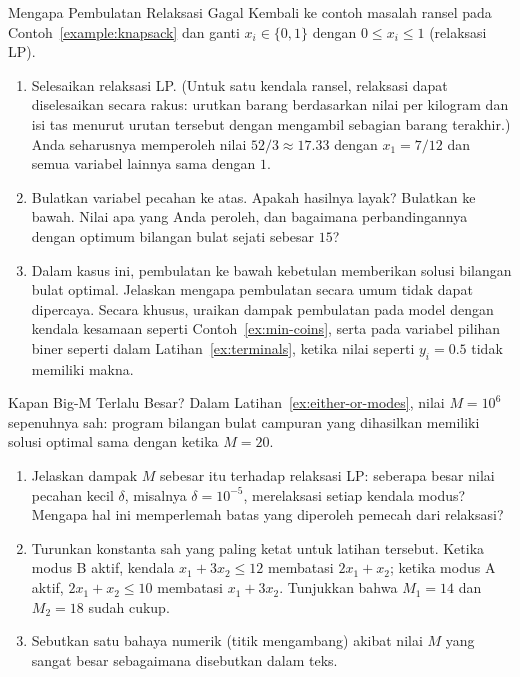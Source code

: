 \begin{ex}{Mengapa Pembulatan Relaksasi Gagal}{}
\label{ex:lp-rounding}
 Kembali ke contoh masalah ransel pada Contoh~\ref{example:knapsack} dan ganti $x_i \in \{0,1\}$ dengan $0 \leq x_i \leq 1$ (relaksasi LP).
\begin{enumerate}
\item Selesaikan relaksasi LP. (Untuk satu kendala ransel, relaksasi dapat diselesaikan secara rakus: urutkan barang berdasarkan nilai per kilogram dan isi tas menurut urutan tersebut dengan mengambil sebagian barang terakhir.) Anda seharusnya memperoleh nilai $52/3 \approx 17.33$ dengan $x_1 = 7/12$ dan semua variabel lainnya sama dengan $1$.
\item Bulatkan variabel pecahan ke atas. Apakah hasilnya layak? Bulatkan ke bawah. Nilai apa yang Anda peroleh, dan bagaimana perbandingannya dengan optimum bilangan bulat sejati sebesar $15$?
\item Dalam kasus ini, pembulatan ke bawah kebetulan memberikan solusi bilangan bulat optimal. Jelaskan mengapa pembulatan secara umum tidak dapat dipercaya. Secara khusus, uraikan dampak pembulatan pada model dengan kendala kesamaan seperti Contoh~\ref{ex:min-coins}, serta pada variabel pilihan biner seperti dalam Latihan~\ref{ex:terminals}, ketika nilai seperti $y_i = 0.5$ tidak memiliki makna.
\end{enumerate}
\end{ex}

\begin{ex}{Kapan Big-M Terlalu Besar?}{}
\label{ex:bigM-size}
 Dalam Latihan~\ref{ex:either-or-modes}, nilai $M = 10^6$ sepenuhnya sah: program bilangan bulat campuran yang dihasilkan memiliki solusi optimal sama dengan ketika $M = 20$.
\begin{enumerate}
\item Jelaskan dampak $M$ sebesar itu terhadap relaksasi LP: seberapa besar nilai pecahan kecil $\delta$, misalnya $\delta = 10^{-5}$, merelaksasi setiap kendala modus? Mengapa hal ini memperlemah batas yang diperoleh pemecah dari relaksasi?
\item Turunkan konstanta sah yang paling ketat untuk latihan tersebut. Ketika modus B aktif, kendala $x_1 + 3x_2 \leq 12$ membatasi $2x_1 + x_2$; ketika modus A aktif, $2x_1 + x_2 \leq 10$ membatasi $x_1 + 3x_2$. Tunjukkan bahwa $M_1 = 14$ dan $M_2 = 18$ sudah cukup.
\item Sebutkan satu bahaya numerik (titik mengambang) akibat nilai $M$ yang sangat besar sebagaimana disebutkan dalam teks.
\end{enumerate}
\end{ex}

